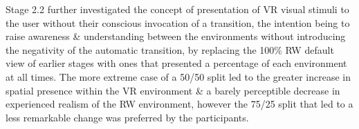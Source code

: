 Stage 2.2 further investigated the concept of presentation of VR visual stimuli to the user without their conscious invocation of a transition, the intention being to raise awareness \& understanding between the environments without introducing the negativity of the automatic transition, by replacing the 100\% RW default view of earlier stages with ones that presented a percentage of each environment at all times. The more extreme case of a 50/50 split led to the greater increase in spatial presence within the VR environment \& a barely perceptible decrease in experienced realism of the RW environment, however the 75/25 split that led to a less remarkable change was preferred by the participants.

